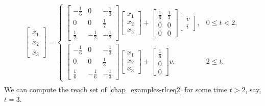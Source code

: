\documentclass[letterpaper,10pt,english]{sphinxmanual}
\begin{document}
\label{chap_examples:equation-rlceq2}\begin{gather}
\begin{split}\left[\begin{array}{c}
\dot{x}_1\\
\dot{x}_2\\
\dot{x}_3\end{array}\right] = \left\{\begin{array}{ll}
\left[\begin{array}{ccc}
-\frac{1}{6} & 0 & -\frac{1}{3}\\
0 & 0 & \frac{1}{7}\\
\frac{1}{2} & -\frac{1}{2} & -\frac{1}{2}\end{array}\right]
\left[\begin{array}{c}
x_1\\
x_2\\
x_3\end{array}\right] + \left[\begin{array}{cc}
\frac{1}{6} & \frac{1}{3}\\
0 & 0\\
0 & 0\end{array}\right]\left[\begin{array}{c}
v\\
i\end{array}\right], & 0\leqslant t< 2, \\
\left[\begin{array}{ccc}
-\frac{1}{6} & 0 & -\frac{1}{3}\\
0 & 0 & \frac{1}{3}\\
\frac{1}{6} & -\frac{1}{6} & -\frac{1}{3}\end{array}\right]
\left[\begin{array}{c}
x_1\\
x_2\\
x_3\end{array}\right] + \left[\begin{array}{c}
\frac{1}{6} \\
0 \\
0 \end{array}\right]v, & 2\leqslant t. \end{array}\right.\end{split}\label{chap_examples-rlceq2}
\end{gather}
We can compute the reach set of \eqref{chap_examples-rlceq2} for some time $t>2$,
say, $t=3$.
\end{document}
